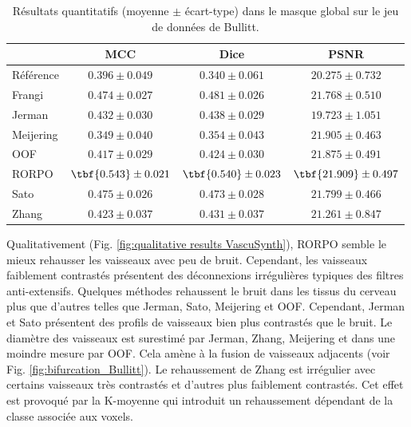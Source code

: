 \begin{table}[!ht]
  \begin{center}
      \caption{Résultats quantitatifs (moyenne $\pm$ écart-type) dans le masque global \maskglobal sur le jeu de données de Bullitt.}
      \label{tab:quantitative results Bullit}
  \begin{tabular}{lccc}
      \hline
          & MCC & Dice & PSNR \\ 
      \hline
      Référence	  & $ 0.396 \pm 0.049 $ & $ 0.340 \pm 0.061 $ & $ 20.275 \pm	0.732 $ \\ 
      Frangi	    & $ 0.474 \pm 0.027 $ & $ 0.481 \pm 0.026 $ & $ 21.768 \pm	0.510 $ \\ 
      Jerman	    & $ 0.432 \pm 0.030 $ & $ 0.438 \pm 0.029 $ & $ 19.723 \pm	1.051 $ \\ 
      Meijering	  & $ 0.349 \pm 0.040 $ & $ 0.354 \pm 0.043 $ & $ 21.905 \pm	0.463 $ \\ 
      OOF	        & $ 0.417 \pm 0.029 $ & $ 0.424 \pm 0.030 $ & $ 21.875 \pm	0.491 $ \\ 
      RORPO	      & $ \tbf{0.543} \pm 0.021 $ & $ \tbf{0.540} \pm 0.023 $ & $ \tbf{21.909} \pm	0.497 $ \\ 
      Sato	      & $ 0.475 \pm 0.026 $ & $ 0.473 \pm 0.028 $ & $ 21.799 \pm	0.466 $ \\ 
      Zhang	      & $ 0.423 \pm 0.037 $ & $ 0.431 \pm 0.037 $ & $ 21.261 \pm	0.847 $ \\ 

      \hline
  \end{tabular} 
\end{center}
\end{table}

Qualitativement (Fig. \ref{fig:qualitative results VascuSynth}), RORPO semble le mieux rehausser les vaisseaux avec peu de bruit. Cependant, les vaisseaux faiblement contrastés présentent des déconnexions irrégulières typiques des filtres anti-extensifs. Quelques méthodes rehaussent le bruit dans les tissus du cerveau plus que d'autres telles que Jerman, Sato, Meijering et OOF. Cependant, Jerman et Sato présentent des profils de vaisseaux bien plus contrastés que le bruit. Le diamètre des vaisseaux est surestimé par Jerman, Zhang, Meijering et dans une moindre mesure par OOF. Cela amène à la fusion de vaisseaux adjacents (voir Fig. \ref{fig:bifurcation_Bullitt}). Le rehaussement de Zhang est irrégulier avec certains vaisseaux très contrastés et d'autres plus faiblement contrastés. Cet effet est provoqué par la K-moyenne qui introduit un rehaussement dépendant de la classe associée aux voxels.

